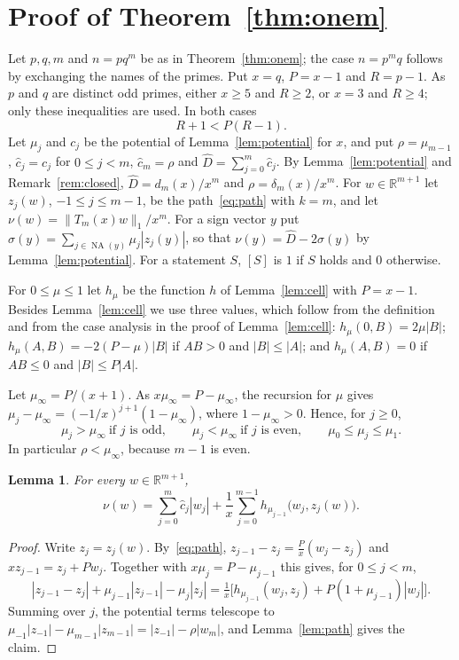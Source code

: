 \documentclass[11pt]{article}
\newtheorem{lemma}[theorem]{Lemma}
\theoremstyle{remark}
\newcommand{\NA}{\operatorname{NA}}
\begin{document}
\section{Proof of Theorem~\ref{thm:onem}}\label{sec:onem}
Let $p,q,m$ and $n=pq^m$ be as in Theorem~\ref{thm:onem}; the case $n=p^mq$
follows by exchanging the names of the primes. Put $x=q$, $P=x-1$ and
$R=p-1$. As $p$ and $q$ are distinct odd primes, either $x\ge5$ and $R\ge2$,
or $x=3$ and $R\ge4$; only these inequalities are used. In both cases
\begin{equation}\label{eq:RP}
R+1<P(R-1).
\end{equation}
Let $\mu_j$ and $c_j$ be the potential of Lemma~\ref{lem:potential} for $x$,
and put $\rho=\mu_{m-1}$, $\hat c_j=c_j$ for $0\le j<m$, $\hat c_m=\rho$ and
$\hat D=\sum_{j=0}^m\hat c_j$. By Lemma~\ref{lem:potential} and
Remark~\ref{rem:closed}, $\hat D=d_m(x)/x^m$ and $\rho=\delta_m(x)/x^m$. For
$w\in\mathbb R^{m+1}$ let $z_j(w)$, $-1\le j\le m-1$, be the
path~\eqref{eq:path} with $k=m$, and let $\nu(w)=\|T_m(x)w\|_1/x^m$. For a
sign vector $y$ put $\sigma(y)=\sum_{j\in\NA(y)}\mu_j|z_j(y)|$, so that
$\nu(y)=\hat D-2\sigma(y)$ by Lemma~\ref{lem:potential}. For a statement $S$,
$[S]$ is $1$ if $S$ holds and $0$ otherwise.

For $0\le\mu\le1$ let $h_\mu$ be the function $h$ of Lemma~\ref{lem:cell}
with $P=x-1$. Besides Lemma~\ref{lem:cell} we use three values, which follow
from the definition and from the case analysis in the proof of
Lemma~\ref{lem:cell}: $h_\mu(0,B)=2\mu|B|$; $h_\mu(A,B)=-2(P-\mu)|B|$ if
$AB>0$ and $|B|\le|A|$; and $h_\mu(A,B)=0$ if $AB\le0$ and $|B|\le P|A|$.

Let $\mu_\infty=P/(x+1)$. As $x\mu_\infty=P-\mu_\infty$, the recursion for
$\mu$ gives $\mu_j-\mu_\infty=(-1/x)^{j+1}(1-\mu_\infty)$, where
$1-\mu_\infty>0$. Hence, for $j\ge0$,
\begin{equation}\label{eq:muinf}
\mu_j>\mu_\infty\ \text{if $j$ is odd},\qquad
\mu_j<\mu_\infty\ \text{if $j$ is even},\qquad
\mu_0\le\mu_j\le\mu_1.
\end{equation}
In particular $\rho<\mu_\infty$, because $m-1$ is even.

\begin{lemma}\label{lem:realpot}
For every $w\in\mathbb R^{m+1}$,
\[
\nu(w)=\sum_{j=0}^m\hat c_j|w_j|
+\frac1x\sum_{j=0}^{m-1}h_{\mu_{j-1}}\bigl(w_j,z_j(w)\bigr).
\]
\end{lemma}
\begin{proof}
Write $z_j=z_j(w)$. By~\eqref{eq:path}, $z_{j-1}-z_j=\frac Px(w_j-z_j)$ and
$xz_{j-1}=z_j+Pw_j$. Together with $x\mu_j=P-\mu_{j-1}$ this gives, for
$0\le j<m$,
\[
|z_{j-1}-z_j|+\mu_{j-1}|z_{j-1}|-\mu_j|z_j|
=\tfrac1x\bigl[h_{\mu_{j-1}}(w_j,z_j)+P(1+\mu_{j-1})|w_j|\bigr].
\]
Summing over $j$, the potential terms telescope to
$\mu_{-1}|z_{-1}|-\mu_{m-1}|z_{m-1}|=|z_{-1}|-\rho|w_m|$, and
Lemma~\ref{lem:path} gives the claim.
\end{proof}
\end{document}
